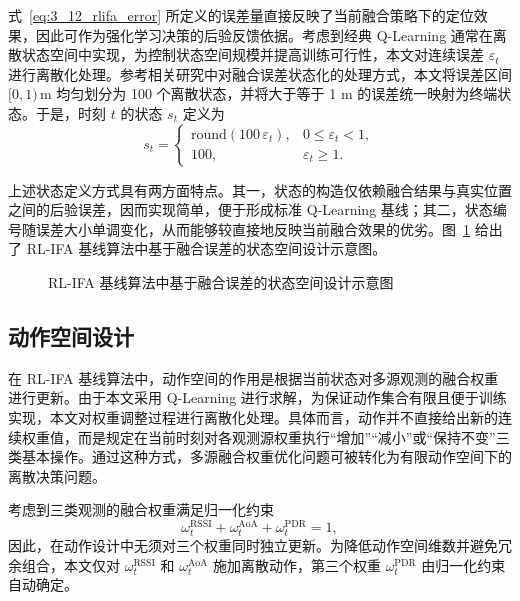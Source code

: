 式~\eqref{eq:3_12_rlifa_error} 所定义的误差量直接反映了当前融合策略下的定位效果，因此可作为强化学习决策的后验反馈依据。考虑到经典 Q-Learning 通常在离散状态空间中实现，为控制状态空间规模并提高训练可行性，本文对连续误差 \(\varepsilon_t\) 进行离散化处理。参考相关研究中对融合误差状态化的处理方式，本文将误差区间 \([0,1)\,\mathrm{m}\) 均匀划分为 100 个离散状态，并将大于等于 1 m 的误差统一映射为终端状态。于是，时刻 \(t\) 的状态 \(s_t\) 定义为
\begin{equation}
s_t=
\begin{cases}
\mathrm{round}(100\,\varepsilon_t), & 0 \leq \varepsilon_t < 1,\\
100, & \varepsilon_t \geq 1.
\end{cases}
\label{eq:3_13_rlifa_state}
\end{equation}

上述状态定义方式具有两方面特点。其一，状态的构造仅依赖融合结果与真实位置之间的后验误差，因而实现简单，便于形成标准 Q-Learning 基线；其二，状态编号随误差大小单调变化，从而能够较直接地反映当前融合效果的优劣。图~\ref{fig:rlifa_state_design} 给出了 RL-IFA 基线算法中基于融合误差的状态空间设计示意图。

\begin{figure}[htbp]
    \centering
    \vspace{4.2cm}
    \caption{RL-IFA 基线算法中基于融合误差的状态空间设计示意图}
    \label{fig:rlifa_state_design}
\end{figure}

\subsection{动作空间设计}
\label{subsec:3_3_2}

在 RL-IFA 基线算法中，动作空间的作用是根据当前状态对多源观测的融合权重进行更新。由于本文采用 Q-Learning 进行求解，为保证动作集合有限且便于训练实现，本文对权重调整过程进行离散化处理。具体而言，动作并不直接给出新的连续权重值，而是规定在当前时刻对各观测源权重执行“增加”“减小”或“保持不变”三类基本操作。通过这种方式，多源融合权重优化问题可被转化为有限动作空间下的离散决策问题。

考虑到三类观测的融合权重满足归一化约束
\begin{equation}
\omega_t^{\mathrm{RSSI}}+\omega_t^{\mathrm{AoA}}+\omega_t^{\mathrm{PDR}}=1,
\label{eq:3_14_rlifa_weight_constraint}
\end{equation}
因此，在动作设计中无须对三个权重同时独立更新。为降低动作空间维数并避免冗余组合，本文仅对 \(\omega_t^{\mathrm{RSSI}}\) 和 \(\omega_t^{\mathrm{AoA}}\) 施加离散动作，第三个权重 \(\omega_t^{\mathrm{PDR}}\) 由归一化约束自动确定。

